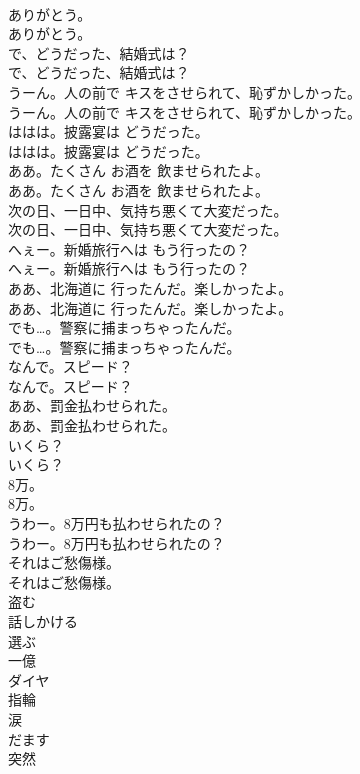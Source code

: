 \documentclass[8pt]{extreport}
\begin{document}
\begin{CJK}{UTF8}{min}
\\	ありがとう。	
\\	ありがとう。 
\\	で、どうだった、結婚式は？	
\\	で、どうだった、結婚式は？ 
\\	うーん。人の前で キスをさせられて、恥ずかしかった。	
\\	うーん。人の前で キスをさせられて、恥ずかしかった。 
\\	ははは。披露宴は どうだった。	
\\	ははは。披露宴は どうだった。 
\\	ああ。たくさん お酒を 飲ませられたよ。	
\\	ああ。たくさん お酒を 飲ませられたよ。 
\\	次の日、一日中、気持ち悪くて大変だった。	
\\	次の日、一日中、気持ち悪くて大変だった。 
\\	へぇー。新婚旅行へは もう行ったの？	
\\	へぇー。新婚旅行へは もう行ったの？ 
\\	ああ、北海道に 行ったんだ。楽しかったよ。	
\\	ああ、北海道に 行ったんだ。楽しかったよ。 
\\	でも…。警察に捕まっちゃったんだ。	
\\	でも…。警察に捕まっちゃったんだ。 
\\	なんで。スピード？	
\\	なんで。スピード？ 
\\	ああ、罰金払わせられた。	
\\	ああ、罰金払わせられた。 
\\	いくら？	
\\	いくら？ 
\\	8万。	
\\	8万。 
\\	うわー。8万円も払わせられたの？	
\\	うわー。8万円も払わせられたの？ 
\\	それはご愁傷様。	
\\	それはご愁傷様。 
\\	盗む
\\	話しかける
\\	選ぶ
\\	一億
\\	ダイヤ
\\	指輪
\\	涙
\\	だます
\\	突然

\end{CJK}
\end{document}
